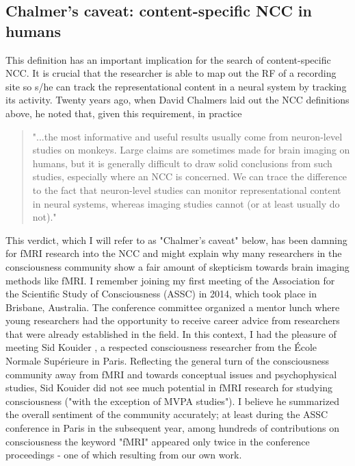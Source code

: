 \subsection{Chalmer's caveat: content-specific NCC in humans}
This definition has an important implication for the search of content-specific NCC. It is crucial that the researcher is able to map out the RF of a recording site so s/he can track the representational content in a neural system by tracking its activity. Twenty years ago, when David Chalmers laid out the NCC definitions above, he noted that, given this requirement, in practice

\begin{quotation}
"...the most informative and useful results usually come from neuron-level studies on monkeys. Large claims are sometimes made for brain imaging on humans, but it is generally difficult to draw solid conclusions from such studies, especially where an NCC is concerned. We can trace the difference to the fact that neuron-level studies can monitor representational content in neural systems, whereas imaging studies cannot (or at least usually do not)."
\parencite[p. 25]{Chalmers2000}
\end{quotation}

This verdict, which I will refer to as "Chalmer's caveat" below, has been damning for fMRI research into the NCC and might explain why many researchers in the consciousness community show a fair amount of skepticism towards brain imaging methods like fMRI. I remember joining my first meeting of the Association for the Scientific Study of Consciousness (ASSC) in 2014, which took place in Brisbane, Australia. The conference committee organized a mentor lunch where young researchers had the opportunity to receive career advice from researchers that were already established in the field. In this context, I had the pleasure of meeting Sid Kouider \parencite{Kouider2010}, a respected consciousness researcher from the École Normale Supérieure in Paris. Reflecting the general turn of the consciousness community away from fMRI and towards conceptual issues and psychophysical studies, Sid Kouider did not see much potential in fMRI research for studying consciousness ("with the exception of MVPA studies"). I believe he summarized the overall sentiment of the community accurately; at least during the ASSC conference in Paris in the subsequent year, among hundreds of contributions on consciousness the keyword "fMRI" appeared only twice in the conference proceedings - one of which resulting from our own work.

